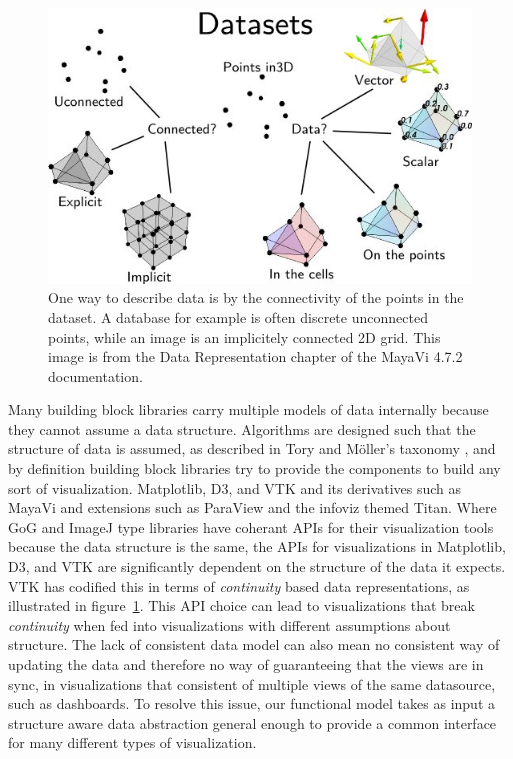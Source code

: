 \documentclass[../main.tex]{subfiles}
\begin{document}
\begin{figure}[H]
    \includegraphics[width=1\textwidth]{figures/intro/dataset_diagram.png}
    \caption{One way to describe data is by the connectivity of the points in the dataset. A database for example is often discrete unconnected points, while an image is an implicitely connected 2D grid. This image is from the Data Representation chapter of the MayaVi 4.7.2 documentation.\cite{DataRepresentationMayavi}}
    \label{fig:intro_data_format}
\end{figure}
Many building block libraries carry multiple models of data internally because they cannot assume a data structure. Algorithms are designed such that the structure of data is assumed, as described in Tory and Möller's taxonomy \cite{ToryRethinkingVisualization2004}, and by definition building block libraries try to  provide the components to build any sort of visualization. Matplotlib, D3\cite{bostockDataDrivenDocuments2011}, and VTK \cite{hanwellVisualizationToolkitVTK2015,geveci2012vtk} and its derivatives such as MayaVi\cite{RamachandranMayaVI2011} and extensions such as ParaView\cite{ahrens2005paraview} and the infoviz themed Titan\cite{brianwylieUnifiedToolkitInformation2009}. Where GoG and ImageJ type libraries have coherant APIs for their visualization tools because the data structure is the same, the APIs for visualizations in Matplotlib, D3, and VTK are significantly dependent on the structure of the data it expects. VTK has codified this in terms of \textit{continuity} based data representations, as illustrated in figure~\ref{fig:intro_data_format}. This API choice can lead to visualizations that break \textit{continuity} when fed into visualizations with different assumptions about structure. The lack of consistent data model can also mean no consistent way of updating the data and therefore no way of guaranteeing that the views are in sync, in visualizations that consistent of multiple views of the same datasource, such as dashboards\cite{a.sarikayaWhatWeTalk2019,fewDashboardConfusionRevisited2007}. To resolve this issue, our functional model takes as input a structure aware data abstraction general enough to provide a common interface for many different types of visualization.
\end{document}
